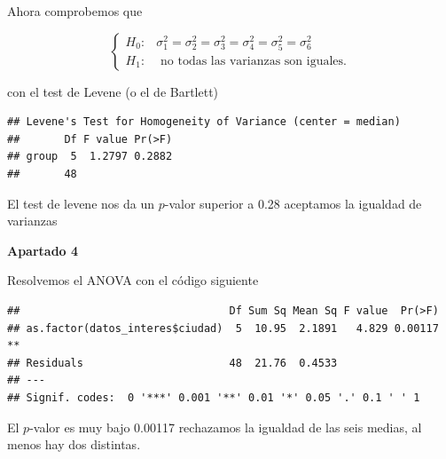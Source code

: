 \documentclass[
]{article}
\newenvironment{Shaded}{\begin{snugshade}}{\end{snugshade}}
\newcommand{\KeywordTok}[1]{\textcolor[rgb]{0.13,0.29,0.53}{\textbf{#1}}}
\newcommand{\NormalTok}[1]{#1}
\newcommand{\OperatorTok}[1]{\textcolor[rgb]{0.81,0.36,0.00}{\textbf{#1}}}
\begin{document}
Ahora comprobemos que

\[
\left\{
\begin{array}{ll}
H_0: &  \sigma^2_1=\sigma^2_2=\sigma^2_3=\sigma^2_4=\sigma^2_5=\sigma^2_6\\
H_1: & \mbox{ no  todas las varianzas son iguales}.
\end{array}
\right.
\]

con el test de Levene (o el de Bartlett)

\begin{Shaded}
\end{Shaded}

\begin{verbatim}
## Levene's Test for Homogeneity of Variance (center = median)
##       Df F value Pr(>F)
## group  5  1.2797 0.2882
##       48
\end{verbatim}

El test de levene nos da un \(p\)-valor superior a 0.28 aceptamos la
igualdad de varianzas

\textbf{Apartado 4}

Resolvemos el ANOVA con el código siguiente

\begin{Shaded}
\end{Shaded}

\begin{verbatim}
##                                 Df Sum Sq Mean Sq F value  Pr(>F)   
## as.factor(datos_interes$ciudad)  5  10.95  2.1891   4.829 0.00117 **
## Residuals                       48  21.76  0.4533                   
## ---
## Signif. codes:  0 '***' 0.001 '**' 0.01 '*' 0.05 '.' 0.1 ' ' 1
\end{verbatim}

El \(p\)-valor es muy bajo 0.00117 rechazamos la igualdad de las seis
medias, al menos hay dos distintas.
\end{document}
